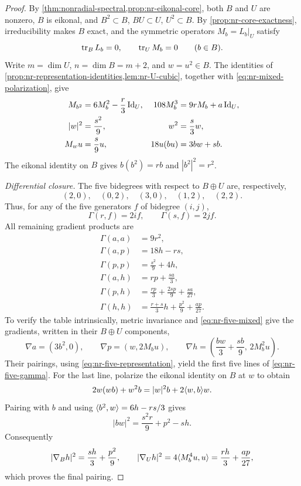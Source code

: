 \begin{proof}
By \cref{thm:nonradial-spectral,prop:nr-eikonal-core},
both $B$ and $U$ are nonzero, $B$ is eikonal, and
$B^2\subset B$, $BU\subset U$, $U^2\subset B$.
By \cref{prop:nr-core-exactness}, irreducibility makes $B$ exact,
and the symmetric operators $M_b=L_b|_U$ satisfy
\begin{equation}\label{eq:nr-five-traces}
 \operatorname{tr}_B L_b=0,\qquad \operatorname{tr}_U M_b=0\qquad(b\in B).
\end{equation}
Write $m=\dim U$, $n=\dim B=m+2$, and $w=u^2\in B$.
The identities of
\cref{prop:nr-representation-identities,lem:nr-U-cubic}, together with
\eqref{eq:nr-mixed-polarization}, give
\begin{align}
 M_{b^2}&=6M_b^2-\frac r3\operatorname{Id}_U,
 &108M_b^3&=9rM_b+a\operatorname{Id}_U,\label{eq:nr-five-representation}\\
 |w|^2&=\frac{s^2}{9},
 &w^2&=\frac s3w,\notag\\
 M_wu&=\frac s9u,
 &18u(bu)&=3bw+sb.\label{eq:nr-five-mixed}
\end{align}
The eikonal identity on $B$ gives $b(b^2)=rb$ and $|b^2|^2=r^2$.

\emph{Differential closure.}
The five bidegrees with respect to $B\oplus U$ are, respectively,
\[
 (2,0),\quad(0,2),\quad(3,0),\quad(1,2),\quad(2,2).
\]
Thus, for any of the
five generators $f$ of bidegree $(i,j)$,
\[
 \Gamma(r,f)=2if,\qquad \Gamma(s,f)=2jf.
\]
All remaining gradient products are
\begin{equation}\label{eq:nr-five-gamma}
\begin{aligned}
 \Gamma(a,a)&=9r^2,\\
 \Gamma(a,p)&=18h-rs,\\
 \Gamma(p,p)&=\frac{s^2}{9}+4h,\\
 \Gamma(a,h)&=rp+\frac{sa}{3},\\
 \Gamma(p,h)&=\frac{rp}{3}+\frac{2sp}{9}+\frac{sa}{27},\\
 \Gamma(h,h)&=\frac{r+s}{3}h+\frac{p^2}{9}+\frac{ap}{27}.
\end{aligned}
\end{equation}
To verify the table intrinsically, metric invariance and
\eqref{eq:nr-five-mixed} give the gradients, written in their
$B\oplus U$ components,
\begin{equation}\label{eq:nr-five-gradients}
 \nabla a=(3b^2,0),\qquad
 \nabla p=(w,2M_bu),\qquad
 \nabla h=\left(\frac{bw}{3}+\frac{sb}{9},\,2M_b^2u\right).
\end{equation}
Their pairings, using \eqref{eq:nr-five-representation}, yield the
first five lines of \eqref{eq:nr-five-gamma}.
For the last line, polarize the eikonal identity on $B$ at $w$ to obtain
\[
 2w(wb)+w^2b=|w|^2b+2\langle w,b\rangle w.
\]
Pairing with $b$ and using
$\langle b^2,w\rangle=6h-rs/3$ gives
\[
 |bw|^2=\frac{s^2r}{9}+p^2-sh.
\]
Consequently
\[
 |\nabla_Bh|^2=\frac{sh}{3}+\frac{p^2}{9},\qquad
 |\nabla_Uh|^2=4\langle M_b^4u,u\rangle
             =\frac{rh}{3}+\frac{ap}{27},
\]
which proves the final pairing.


\end{proof}
